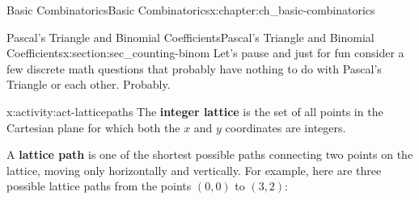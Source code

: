\documentclass[oneside,10pt,]{book}
\newcommand{\terminology}[1]{\textbf{#1}}
\numberwithin{equation}{chapter}
\begin{document}
\begin{chapterptx}{Basic Combinatorics}{}{Basic Combinatorics}{}{}{x:chapter:ch_basic-combinatorics}
\begin{sectionptx}{Pascal's Triangle and Binomial Coefficients}{}{Pascal's Triangle and Binomial Coefficients}{}{}{x:section:sec_counting-binom}
Let's pause and just for fun consider a few discrete math questions that probably have nothing to do with Pascal's Triangle or each other.  Probably.%
\begin{activity}{}{x:activity:act-latticepaths}%
The \terminology{integer lattice} is the set of all points in the Cartesian plane for which both the \(x\) and \(y\) coordinates are integers.%
\par
A \terminology{lattice path} is one of the shortest possible paths connecting two points on the lattice, moving only horizontally and vertically. For example, here are three possible lattice paths from the points \((0,0)\) to \((3,2)\):%
\begin{sidebyside}{3}{0.0166666666666667}{0.0166666666666667}{0.0333333333333333}%
\begin{sbspanel}{0.3}%
%
\end{sbspanel}%
\begin{sbspanel}{0.3}%
%
\end{sbspanel}%
\begin{sbspanel}{0.3}%
%
\end{sbspanel}%
\end{sidebyside}%
\begin{enumerate}[font=\bfseries,label=(\alph*),ref=\alph*]

\end{enumerate}
\end{activity}
\end{sectionptx}
\end{chapterptx}
\end{document}
